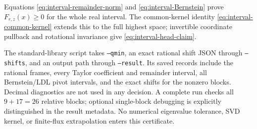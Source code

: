 Equations \eqref{eq:interval-remainder-norm} and
\eqref{eq:interval-Bernstein} prove $F_{r,z}(x)\ge0$ for the whole real
interval. The common-kernel identity \eqref{eq:interval-common-kernel}
extends this to the full highest space; invertible coordinate pullback
and rotational invariance give \eqref{eq:interval-head-claim}.

The standard-library script  takes
\texttt{--qmin}, an exact rational shift JSON through \texttt{--shifts},
and an output path through \texttt{--result}. Its saved records include
the rational frames, every Taylor coefficient and remainder interval,
all Bernstein/LDL pivot intervals, and the exact shifts for the nonzero
blocks. Decimal diagnostics are not used in any decision. A complete
run checks all $9+17=26$ relative blocks; optional single-block debugging
is explicitly distinguished in the result metadata. No numerical
eigenvalue tolerance, SVD kernel, or finite-flux extrapolation enters
this certificate.
